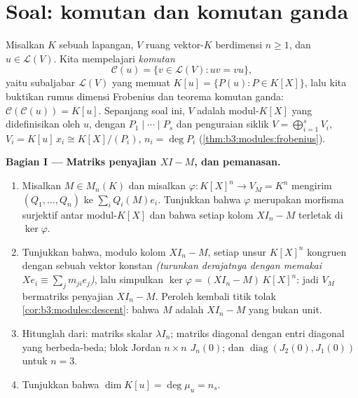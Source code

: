 \section{Soal: komutan dan komutan ganda}

\begin{problem}\label{pb:b3:modules:1}
Misalkan $K$ sebuah lapangan, $V$ ruang vektor-$K$ berdimensi $n \geq
1$, dan $u \in \mathcal L(V)$. Kita mempelajari \emph{komutan}
\[
\mathcal C(u) = \{v \in \mathcal L(V) : uv = vu\},
\]
yaitu subaljabar $\mathcal L(V)$ yang memuat $K[u] = \{P(u) : P \in
K[X]\}$, lalu kita buktikan rumus dimensi Frobenius dan teorema komutan
ganda: $\mathcal C(\mathcal C(u)) = K[u]$. Sepanjang soal ini,
$V$ adalah modul-$K[X]$ yang didefinisikan oleh $u$, dengan 
$P_1 \mid \cdots \mid P_s$ dan penguraian siklik $V =
\bigoplus_{i=1}^s V_i$, $V_i = K[u]\,x_i \cong K[X]/(P_i)$, $n_i
= \deg P_i$ (\cref{thm:b3:modules:frobenius}).

\medskip
\noindent\textbf{Bagian I --- Matriks penyajian $XI - M$, dan
pemanasan.}
\begin{enumerate}
  \item Misalkan $M \in M_n(K)$ dan misalkan $\varphi \colon K[X]^n \to V_M
        = K^n$ mengirim $(Q_1, \dots, Q_n)$ ke $\sum_i Q_i(M)e_i$.
        Tunjukkan bahwa $\varphi$ merupakan morfisma surjektif antar
        modul-$K[X]$ dan bahwa setiap kolom $XI_n - M$ terletak
        di $\ker\varphi$.
  \item Tunjukkan bahwa, modulo kolom $XI_n - M$, setiap
        unsur $K[X]^n$ kongruen dengan sebuah vektor konstan
        \emph{(turunkan derajatnya dengan memakai $Xe_i \equiv \sum_j m_{ji}e_j$)},
        lalu simpulkan $\ker\varphi = (XI_n - M)\,K[X]^n$: jadi 
        $V_M$ bermatriks penyajian $XI_n - M$. Peroleh kembali
        titik tolak \cref{cor:b3:modules:descent}: bahwa
         $M$ adalah 
        $XI_n - M$ yang bukan unit.
  \item Hitunglah  dari: matriks skalar
        $\lambda I_n$; matriks diagonal dengan entri diagonal
        yang berbeda-beda; blok Jordan $n \times n$ $J_n(0)$;
        dan $\operatorname{diag}(J_2(0), J_1(0))$ untuk $n = 3$.
  \item Tunjukkan bahwa $\dim K[u] = \deg \mu_u = n_s$.
\end{enumerate}


\end{problem}

